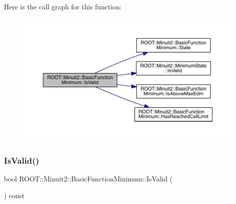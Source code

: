 Here is the call graph for this function\+:
\nopagebreak
\begin{figure}[H]
\begin{center}
\leavevmode
\includegraphics[width=350pt]{de/d25/classROOT_1_1Minuit2_1_1BasicFunctionMinimum_a644f34dabb94b0b5bdc8f7b8bfa7ae4b_cgraph}
\end{center}
\end{figure}
\mbox{\label{classROOT_1_1Minuit2_1_1BasicFunctionMinimum_a644f34dabb94b0b5bdc8f7b8bfa7ae4b}} 
\subsubsection{\texorpdfstring{IsValid()}{IsValid()}\hspace{0.1cm}{\footnotesize\ttfamily [3/3]}}
{\footnotesize\ttfamily bool R\+O\+O\+T\+::\+Minuit2\+::\+Basic\+Function\+Minimum\+::\+Is\+Valid (\begin{DoxyParamCaption}{ }\end{DoxyParamCaption}) const\hspace{0.3cm}{\ttfamily [inline]}}

